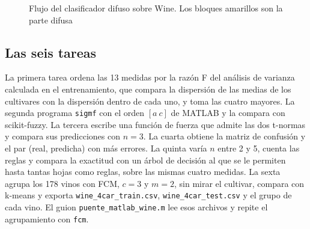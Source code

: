 \documentclass[11pt,letterpaper]{article}
\begin{document}
\begin{figure}[!htb]
    \centering
    \caption{Flujo del clasificador difuso sobre Wine. Los bloques amarillos son la parte difusa}
    \label{fig:flujo}
\end{figure}

\subsection{Las seis tareas}

La primera tarea ordena las 13 medidas por la razón F del análisis de varianza calculada en el entrenamiento, que compara la dispersión de las medias de los cultivares con la dispersión dentro de cada uno, y toma las cuatro mayores. La segunda programa \texttt{sigmf} con el orden $[a\ c]$ de MATLAB y la compara con scikit-fuzzy. La tercera escribe una función de fuerza que admite las dos t-normas y compara sus predicciones con $n=3$. La cuarta obtiene la matriz de confusión y el par (real, predicha) con más errores. La quinta varía $n$ entre 2 y 5, cuenta las reglas y compara la exactitud con un árbol de decisión al que se le permiten hasta tantas hojas como reglas, sobre las mismas cuatro medidas. La sexta agrupa los 178 vinos con FCM, $c=3$ y $m=2$, sin mirar el cultivar, compara con k-means y exporta \texttt{wine\_4car\_train.csv}, \texttt{wine\_4car\_test.csv} y el grupo de cada vino. El guion \texttt{puente\_matlab\_wine.m} lee esos archivos y repite el agrupamiento con \texttt{fcm}.
\end{document}
